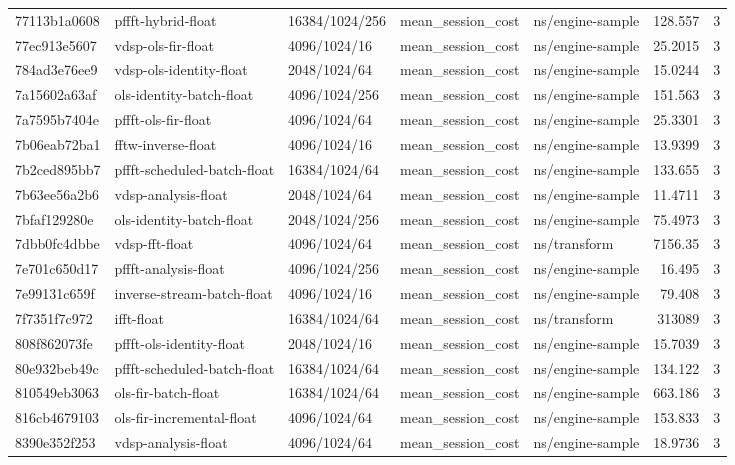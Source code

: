 \begin{longtable}{lllllrr}
77113b1a0608 & pffft-hybrid-float & 16384/1024/256 & mean\_session\_cost & ns/engine-sample & 128.557 & 3 \\
77ec913e5607 & vdsp-ols-fir-float & 4096/1024/16 & mean\_session\_cost & ns/engine-sample & 25.2015 & 3 \\
784ad3e76ee9 & vdsp-ols-identity-float & 2048/1024/64 & mean\_session\_cost & ns/engine-sample & 15.0244 & 3 \\
7a15602a63af & ols-identity-batch-float & 4096/1024/256 & mean\_session\_cost & ns/engine-sample & 151.563 & 3 \\
7a7595b7404e & pffft-ols-fir-float & 4096/1024/64 & mean\_session\_cost & ns/engine-sample & 25.3301 & 3 \\
7b06eab72ba1 & fftw-inverse-float & 4096/1024/16 & mean\_session\_cost & ns/engine-sample & 13.9399 & 3 \\
7b2ced895bb7 & pffft-scheduled-batch-float & 16384/1024/64 & mean\_session\_cost & ns/engine-sample & 133.655 & 3 \\
7b63ee56a2b6 & vdsp-analysis-float & 2048/1024/64 & mean\_session\_cost & ns/engine-sample & 11.4711 & 3 \\
7bfaf129280e & ols-identity-batch-float & 2048/1024/256 & mean\_session\_cost & ns/engine-sample & 75.4973 & 3 \\
7dbb0fc4dbbe & vdsp-fft-float & 4096/1024/64 & mean\_session\_cost & ns/transform & 7156.35 & 3 \\
7e701c650d17 & pffft-analysis-float & 4096/1024/256 & mean\_session\_cost & ns/engine-sample & 16.495 & 3 \\
7e99131c659f & inverse-stream-batch-float & 4096/1024/16 & mean\_session\_cost & ns/engine-sample & 79.408 & 3 \\
7f7351f7c972 & ifft-float & 16384/1024/64 & mean\_session\_cost & ns/transform & 313089 & 3 \\
808f862073fe & pffft-ols-identity-float & 2048/1024/16 & mean\_session\_cost & ns/engine-sample & 15.7039 & 3 \\
80e932beb49c & pffft-scheduled-batch-float & 16384/1024/64 & mean\_session\_cost & ns/engine-sample & 134.122 & 3 \\
810549eb3063 & ols-fir-batch-float & 16384/1024/64 & mean\_session\_cost & ns/engine-sample & 663.186 & 3 \\
816cb4679103 & ols-fir-incremental-float & 4096/1024/64 & mean\_session\_cost & ns/engine-sample & 153.833 & 3 \\
8390e352f253 & vdsp-analysis-float & 4096/1024/64 & mean\_session\_cost & ns/engine-sample & 18.9736 & 3 \\

\end{longtable}

